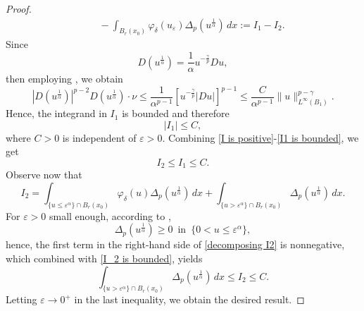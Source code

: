 \documentclass[11pt, reqno]{amsart}
\numberwithin{equation}{section}
\numberwithin{theorem}{section}
\numberwithin{lemma}{section}
\numberwithin{corollary}{section}
\numberwithin{remark}{section}
\numberwithin{proposition}{section}
\numberwithin{definition}{section}
\begin{document}
\begin{proof}
\begin{align}
        &\quad-\int_{B_r(x_0)}\varphi_\delta(u_\varepsilon)\Delta_p(u^{\frac{1}{\alpha}})\,dx:=I_1-I_2.
    \end{align}
    Since 
    $$
     D(u^{\frac{1}{\alpha}})=\frac{1}{\alpha}u^{-\frac{\gamma}{p}}Du,
    $$
    then employing , we obtain
    $$
    |D(u^{\frac{1}{\alpha}})|^{p-2}D(u^{\frac{1}{\alpha}})\cdot\nu\le\frac{1}{\alpha^{p-1}}\left[u^{-\frac{\gamma}{p}}|Du|\right]^{p-1}\le\frac{C}{\alpha^{p-1}}\|u\|^{p-\gamma}_{L^\infty(B_1)}.
    $$
    Hence, the integrand in $I_1$ is bounded and therefore
    \begin{equation}\label{I1 is bounded}
        |I_1|\le C,
    \end{equation}
    where $C>0$ is independent of $\varepsilon>0$.
    Combining \eqref{I is positive}-\eqref{I1 is bounded}, we get
    \begin{equation}\label{I_2 is bounded}
        I_2\le I_1\le C.
    \end{equation}
    Observe now that
    \begin{equation}\label{decomposing I2}
        I_2=\int_{\{u\le\varepsilon^\alpha\}\cap B_r(x_0)}\varphi_\delta(u)\Delta_p(u^{\frac{1}{\alpha}})\,dx+\int_{\{u>\varepsilon^\alpha\}\cap B_r(x_0)}\Delta_p(u^{\frac{1}{\alpha}})\,dx.
    \end{equation}
    For $\varepsilon>0$ small enough, according to ,
    $$
    \Delta_p(u^{\frac{1}{\alpha}})\ge0\,\,\,\text{in}\,\,\, \{0<u\le\varepsilon^\alpha\},
    $$
    hence, the first term in the right-hand side of \eqref{decomposing I2} is nonnegative, which combined with \eqref{I_2 is bounded}, yields
    $$
    \int_{\{u>\varepsilon^\alpha\}\cap B_r(x_0)}\Delta_p(u^{\frac{1}{\alpha}})\,dx\le I_2\le C.
    $$
    Letting $\varepsilon\to0^+$ in the last inequality, we obtain the desired result.
\end{proof}
\end{document}
